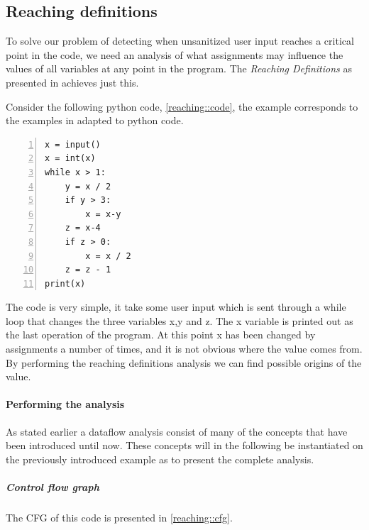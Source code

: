 \subsection{Reaching definitions}
To solve our problem of detecting when unsanitized user input reaches a critical point in the code, we need an analysis of what assignments may influence the values of all variables at any point in the program.
The \emph{Reaching Definitions} as presented in \citet[p.~26]{schwartzbach} achieves just this.

Consider the following python code, \cref{reaching::code}, the example corresponds to the examples in \citet{schwartzbach} adapted to python code.

\begin{lstlisting}[caption={Code example from \citet{schwartzbach} translated to python code.}, label=reaching::code, numbers=left, frame=single, linewidth=6cm]
x = input()
x = int(x)
while x > 1:
    y = x / 2
    if y > 3:
        x = x-y
    z = x-4
    if z > 0:
        x = x / 2
    z = z - 1
print(x)
\end{lstlisting}

The code is very simple, it take some user input which is sent through a while loop that changes the three variables x,y and z.
The x variable is printed out as the last operation of the program.
At this point x has been changed by assignments a number of times, and it is not obvious where the value comes from.
By performing the reaching definitions analysis we can find possible origins of the value.

\paragraph{Performing the analysis}
As stated earlier a dataflow analysis consist of many of the concepts that have been introduced until now.
These concepts will in the following be instantiated on the previously introduced example as to present the complete analysis.

\subparagraph{Control flow graph}
The CFG of this code is presented in \cref{reaching::cfg}.

